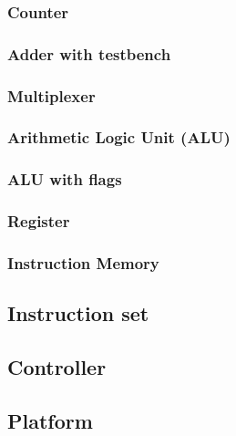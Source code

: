 \documentclass[12pt,a4paper]{article}
\begin{document}
	\subsubsection{Counter}
			
	\subsubsection{Adder with testbench}
			
	\subsubsection{Multiplexer}
			
	\subsubsection{Arithmetic Logic Unit (ALU)}
		
	\subsubsection{ALU with flags}
			
	\subsubsection{Register}
			
	\subsubsection{Instruction Memory}
			
\subsection{Instruction set}
		
\subsection{Controller}
\subsection{Platform}
		
\end{document}
